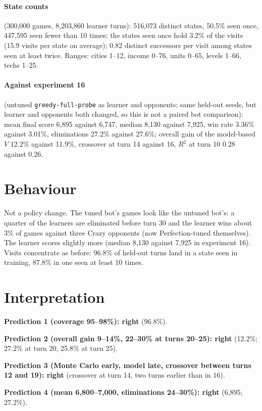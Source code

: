 \documentclass{../polyexp}
\begin{document}
\paragraph{State counts} (300{,}000 games, 8{,}203{,}860 learner turns): 516{,}073 distinct states, 50.5\% seen once,
447{,}595 seen fewer than 10 times; the states seen once hold 3.2\% of the visits (15.9 visits per state on
average); 0.82 distinct successors per visit among states seen at least twice. Ranges: cities 1--12, income
0--76, units 0--65, levels 1--66, techs 1--25.

\paragraph{Against experiment 16} (untuned \texttt{greedy-full-probe} as learner and opponents; same held-out seeds,
but learner and opponents both changed, so this is not a paired bot comparison): mean final score 6{,}895 against
6{,}747, median 8{,}130 against 7{,}925, win rate 3.36\% against 3.01\%, eliminations 27.2\% against 27.6\%; overall
gain of the model-based $V$ 12.2\% against 11.9\%, crossover at turn 14 against 16, $R^2$ at turn 10 0.28 against
0.26.

\section{Behaviour}
Not a policy change. The tuned bot's games look like the untuned bot's: a quarter of the learners are eliminated
before turn 30 and the learner wins about 3\% of games against three Crazy opponents (now Perfection-tuned
themselves). The learner scores slightly more (median 8{,}130 against 7{,}925 in experiment 16). Visits concentrate as
before: 96.8\% of held-out turns land in a state seen in training, 87.8\% in one seen at least 10 times.

\section{Interpretation}
\textbf{Prediction 1 (coverage 95--98\%): right} (96.8\%).

\textbf{Prediction 2 (overall gain 9--14\%, 22--30\% at turns 20--25): right} (12.2\%; 27.2\% at turn 20, 25.8\% at
turn 25).

\textbf{Prediction 3 (Monte Carlo early, model late, crossover between turns 12 and 19): right} (crossover at turn
14, two turns earlier than in 16).

\textbf{Prediction 4 (mean 6{,}800--7{,}000, eliminations 24--30\%): right} (6{,}895; 27.2\%).
\end{document}

